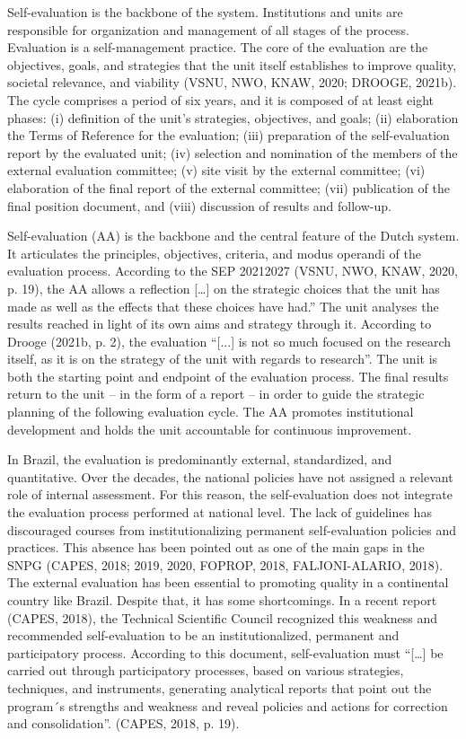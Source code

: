 Self-evaluation is the backbone of the system. Institutions and units are responsible for organization and management of all stages of the process. Evaluation is a self-management practice. The core of the evaluation are the objectives, goals, and strategies that the unit itself establishes to improve quality, societal relevance, and viability (VSNU, NWO, KNAW, 2020; DROOGE, 2021b). The cycle comprises a period of six years, and it is composed of at least eight phases: (i) definition of the unit's strategies, objectives, and goals; (ii) elaboration the Terms of Reference for the evaluation; (iii) preparation of the self-evaluation report by the evaluated unit; (iv) selection and nomination of the members of the external evaluation committee; (v) site visit by the external committee; (vi) elaboration of the final report of the external committee; (vii) publication of the final position document, and (viii) discussion of results and follow-up.     

Self-evaluation (AA) is the backbone and the central feature of the Dutch system. It articulates the principles, objectives, criteria, and modus operandi of the evaluation process. According to the SEP  20212027 (VSNU, NWO, KNAW, 2020, p. 19), the AA allows a reflection […] on the strategic choices that the unit has made as well as the effects that these choices have had.” The unit analyses the results reached in light of its own aims and strategy through it. 
According to Drooge (2021b, p. 2), the evaluation 
“[...] is not so much focused on the research itself, as it is on the strategy of the unit with regards to research”. The unit is both the starting point and endpoint of the evaluation process. The final results return to the unit – in the form of a report – in order to guide the strategic planning of the following evaluation cycle. The AA promotes institutional development and holds the unit accountable for continuous improvement. 


In Brazil, the evaluation is predominantly external, standardized, and quantitative. Over the decades, the national policies have not assigned a relevant role of internal assessment. For this reason, the self-evaluation does not integrate the evaluation process performed at national level. The lack of guidelines has discouraged courses from institutionalizing permanent self-evaluation policies and practices. This absence has been pointed out as one of the main gaps in the SNPG 
(CAPES, 2018; 2019, 2020, FOPROP, 2018, FALJONI-ALARIO, 2018). The external evaluation has been essential to promoting quality in a continental country like Brazil. Despite that, it has some shortcomings. In a recent report (CAPES, 2018), the Technical Scientific Council recognized this weakness and recommended self-evaluation to be an institutionalized, permanent and participatory process. 
According to this document, self-evaluation must “[…] be carried out through participatory processes, based on various strategies, techniques, and instruments, generating analytical reports that point out the program´s strengths and weakness and reveal policies and actions for correction and consolidation”. 
(CAPES, 2018, p. 19). 



